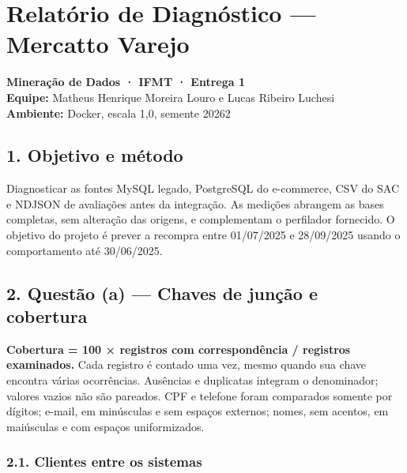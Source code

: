 \documentclass[
]{article}
\author{}
\date{}
\begin{document}
\section{Relatório de Diagnóstico --- Mercatto
Varejo}\label{relatuxf3rio-de-diagnuxf3stico-mercatto-varejo}

\textbf{Mineração de Dados · IFMT · Entrega 1}\\
\textbf{Equipe:} Matheus Henrique Moreira Louro e Lucas Ribeiro
Luchesi\\
\textbf{Ambiente:} Docker, escala 1,0, semente 20262

\subsection{1. Objetivo e método}\label{objetivo-e-muxe9todo}

Diagnosticar as fontes MySQL legado, PostgreSQL do e-commerce, CSV do
SAC e NDJSON de avaliações antes da integração. As medições abrangem as
bases completas, sem alteração das origens, e complementam o perfilador
fornecido. O objetivo do projeto é prever a recompra entre 01/07/2025 e
28/09/2025 usando o comportamento até 30/06/2025.

\subsection{2. Questão (a) --- Chaves de junção e
cobertura}\label{questuxe3o-a-chaves-de-junuxe7uxe3o-e-cobertura}

\textbf{Cobertura = 100 × registros com correspondência / registros
examinados.} Cada registro é contado uma vez, mesmo quando sua chave
encontra várias ocorrências. Ausências e duplicatas integram o
denominador; valores vazios não são pareados. CPF e telefone foram
comparados somente por dígitos; e-mail, em minúsculas e sem espaços
externos; nomes, sem acentos, em maiúsculas e com espaços uniformizados.

\subsubsection{2.1. Clientes entre os
sistemas}\label{clientes-entre-os-sistemas}
\end{document}
